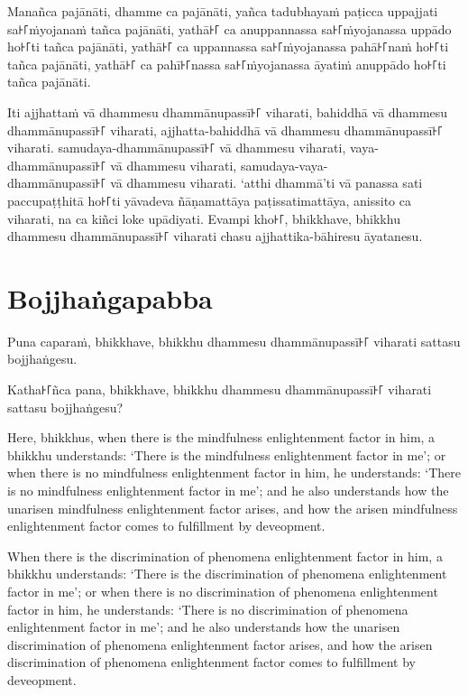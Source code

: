 Manañca pajānāti,
dhamme ca pajānāti,
yañca tadubhayaṁ paṭicca uppajjati sa꜔꜒ṁyojanaṁ tañca pajānāti,
yathā꜔꜒ ca anuppannassa sa꜔꜒ṁyojanassa uppādo ho꜔꜒ti tañca pajānāti,
yathā꜔꜒ ca uppannassa sa꜔꜒ṁyojanassa pahā꜔꜒naṁ ho꜔꜒ti tañca pajānāti,
yathā꜔꜒ ca pahī꜔꜒nassa sa꜔꜒ṁyojanassa āyatiṁ anuppādo ho꜔꜒ti tañca pajānāti.

Iti ajjhattaṁ vā dhammesu dhammānupassī꜔꜒ viharati,
bahiddhā vā dhammesu dhammānupassī꜔꜒ viharati,
ajjhatta-bahiddhā vā dhammesu dhammānupassī꜔꜒ viharati.
samudaya-dhammānupassī꜔꜒ vā dhammesu viharati,
vaya-dhammānupassī꜔꜒ vā dhammesu viharati,
samudaya-vaya-\\ dhammānupassī꜔꜒ vā dhammesu viharati.
‘atthi dhammā’ti vā panassa sati paccupaṭṭhitā ho꜔꜒ti
yāvadeva ñāṇamattāya paṭissatimattāya, anissito ca viharati,
na ca kiñci loke upādiyati. Evampi kho꜔꜒, bhikkhave, bhikkhu
dhammesu dhammānupassī꜔꜒ viharati chasu ajjhattika-bāhiresu āyatanesu.


\section*{Bojjhaṅgapabba}

Puna caparaṁ, bhikkhave, bhikkhu dhammesu dhammānupassī꜔꜒ viharati sattasu
bojjhaṅgesu.

Katha꜔꜒ñca pana, bhikkhave, bhikkhu dhammesu dhammānupassī꜔꜒ viharati sattasu
bojjhaṅgesu?

\englishPage

Here, bhikkhus, when there is the mindfulness enlightenment factor in him, a
bhikkhu understands: `There is the mindfulness enlightenment factor in me'; or
when there is no mindfulness enlightenment factor in him, he understands: `There
is no mindfulness enlightenment factor in me'; and he also understands how the
unarisen mindfulness enlightenment factor arises, and how the arisen mindfulness
enlightenment factor comes to fulfillment by deveopment.

When there is the discrimination of phenomena enlightenment factor in him, a
bhikkhu understands: `There is the discrimination of phenomena enlightenment
factor in me'; or when there is no discrimination of phenomena enlightenment
factor in him, he understands: `There is no discrimination of phenomena
enlightenment factor in me'; and he also understands how the unarisen
discrimination of phenomena enlightenment factor arises, and how the arisen
discrimination of phenomena enlightenment factor comes to fulfillment by
deveopment.

